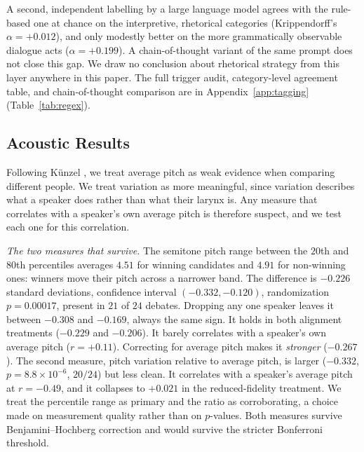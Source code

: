 \documentclass[pdflatex,sn-mathphys-num]{sn-jnl}%
\begin{document}
A second, independent labelling by a large language model agrees with the
rule-based one at chance on the interpretive, rhetorical categories
(Krippendorff's $\alpha = +0.012$), and only modestly better on the more
grammatically observable dialogue acts ($\alpha = +0.199$). A
chain-of-thought variant of the same prompt does not close this gap. We
draw no conclusion about rhetorical strategy from this layer anywhere in
this paper. The full trigger audit, category-level agreement table, and
chain-of-thought comparison are in Appendix~\ref{app:tagging}
(Table~\ref{tab:regex}).

\subsection{Acoustic Results}
\label{sec:method:acoustic}

Following K\"unzel \cite{kunzel1989speakers}, we treat average pitch as weak
evidence when comparing different people. We treat variation as more
meaningful, since variation describes what a speaker does rather than what
their larynx is. Any measure that correlates with a speaker's own average
pitch is therefore suspect, and we test each one for this correlation.

\emph{The two measures that survive.} The semitone pitch range between the
$20$th and $80$th percentiles averages $4.51$ for winning candidates and
$4.91$ for non-winning ones: winners move their pitch across a narrower
band. The difference is $-0.226$ standard deviations, confidence interval
$(-0.332, -0.120)$, randomization $p = 0.00017$, present in $21$ of $24$
debates. Dropping any one speaker leaves it between $-0.308$ and
$-0.169$, always the same sign. It holds in both alignment treatments
($-0.229$ and $-0.206$). It barely correlates with a speaker's own average
pitch ($r = +0.11$). Correcting for average pitch makes it
\emph{stronger} ($-0.267$). The second measure, pitch variation relative to
average pitch, is larger ($-0.332$, $p = 8.8\times10^{-6}$, $20/24$) but
less clean. It correlates with a speaker's average pitch at $r = -0.49$,
and it collapses to $+0.021$ in the reduced-fidelity treatment. We treat the
percentile range as primary and the ratio as corroborating, a choice made on
measurement quality rather than on $p$-values. Both measures survive
Benjamini--Hochberg correction and would survive the stricter Bonferroni
threshold.
\end{document}
